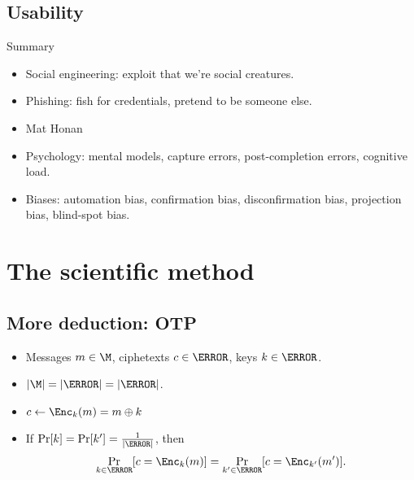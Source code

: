 \subsection{Usability}

\begin{frame}
  \begin{block}{Summary}
    \begin{itemize}
      \item Social engineering: exploit that we're social creatures.
      \item Phishing: fish for credentials, pretend to be someone else.
      \item Mat Honan
      \item Psychology: mental models, capture errors, post-completion errors, 
        cognitive load.
      \item Biases: automation bias, confirmation bias, disconfirmation bias, 
        projection bias, blind-spot bias.
    \end{itemize}
  \end{block}
\end{frame}


\section{The scientific method}

\subsection{More deduction: \acs{OTP}}

\begin{frame}
  \begin{example}
    \begin{itemize}
      \item Messages \(m\in \M\), ciphetexts \(c\in \C\), keys \(k\in \K\).
      \item \(|\M| = |\C| = |\K|\).
      \item \(c\gets \Enc_k(m) = m\oplus k\)
    \end{itemize}
  \end{example}

  \begin{theorem}
    \begin{itemize}
      \item If \(\Pr[k] = \Pr[k'] = \frac{1}{|\K|}\), then
        \[\Pr_{k\in\K}[c = \Enc_k(m)] = \Pr_{k'\in\K}[c = \Enc_{k'}(m')].\]
    \end{itemize}
  \end{theorem}
\end{frame}

